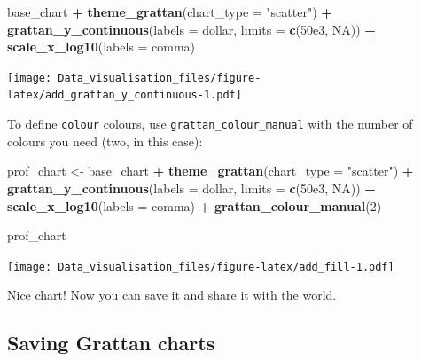 \documentclass[
]{book}
\newenvironment{Shaded}{\begin{snugshade}}{\end{snugshade}}
\newcommand{\DataTypeTok}[1]{\textcolor[rgb]{0.13,0.29,0.53}{#1}}
\newcommand{\DecValTok}[1]{\textcolor[rgb]{0.00,0.00,0.81}{#1}}
\newcommand{\FloatTok}[1]{\textcolor[rgb]{0.00,0.00,0.81}{#1}}
\newcommand{\KeywordTok}[1]{\textcolor[rgb]{0.13,0.29,0.53}{\textbf{#1}}}
\newcommand{\NormalTok}[1]{#1}
\newcommand{\OperatorTok}[1]{\textcolor[rgb]{0.81,0.36,0.00}{\textbf{#1}}}
\newcommand{\OtherTok}[1]{\textcolor[rgb]{0.56,0.35,0.01}{#1}}
\newcommand{\StringTok}[1]{\textcolor[rgb]{0.31,0.60,0.02}{#1}}
\begin{document}
\begin{Shaded}
\begin{Highlighting}[]
\NormalTok{base\_chart }\OperatorTok{+}
\StringTok{        }\KeywordTok{theme\_grattan}\NormalTok{(}\DataTypeTok{chart\_type =} \StringTok{"scatter"}\NormalTok{) }\OperatorTok{+}
\StringTok{        }\KeywordTok{grattan\_y\_continuous}\NormalTok{(}\DataTypeTok{labels =}\NormalTok{ dollar, }\DataTypeTok{limits =} \KeywordTok{c}\NormalTok{(}\FloatTok{50e3}\NormalTok{, }\OtherTok{NA}\NormalTok{)) }\OperatorTok{+}
\StringTok{        }\KeywordTok{scale\_x\_log10}\NormalTok{(}\DataTypeTok{labels =}\NormalTok{ comma) }
\end{Highlighting}
\end{Shaded}

\texttt{[image: Data\_visualisation\_files/figure-latex/add\_grattan\_y\_continuous-1.pdf]}

To define \texttt{colour} colours, use \texttt{grattan\_colour\_manual} with the number of colours you need (two, in this case):

\begin{Shaded}
\begin{Highlighting}[]
\NormalTok{prof\_chart \textless{}{-}}\StringTok{ }\NormalTok{base\_chart }\OperatorTok{+}
\StringTok{        }\KeywordTok{theme\_grattan}\NormalTok{(}\DataTypeTok{chart\_type =} \StringTok{"scatter"}\NormalTok{) }\OperatorTok{+}
\StringTok{        }\KeywordTok{grattan\_y\_continuous}\NormalTok{(}\DataTypeTok{labels =}\NormalTok{ dollar, }\DataTypeTok{limits =} \KeywordTok{c}\NormalTok{(}\FloatTok{50e3}\NormalTok{, }\OtherTok{NA}\NormalTok{)) }\OperatorTok{+}
\StringTok{        }\KeywordTok{scale\_x\_log10}\NormalTok{(}\DataTypeTok{labels =}\NormalTok{ comma) }\OperatorTok{+}
\StringTok{        }\KeywordTok{grattan\_colour\_manual}\NormalTok{(}\DecValTok{2}\NormalTok{) }

\NormalTok{prof\_chart}
\end{Highlighting}
\end{Shaded}

\texttt{[image: Data\_visualisation\_files/figure-latex/add\_fill-1.pdf]}

Nice chart! Now you can save it and share it with the world.

\hypertarget{saving-grattan-charts}{%
\subsection{Saving Grattan charts}\label{saving-grattan-charts}}
\end{document}
